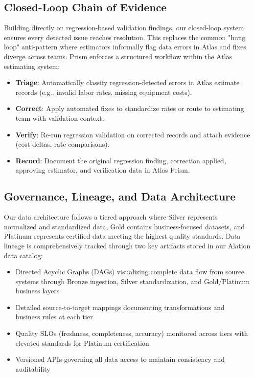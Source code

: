 \documentclass[12pt, a4paper]{article}
\begin{document}
\subsection{Closed-Loop Chain of Evidence}
Building directly on regression-based validation findings, our closed-loop system ensures every detected issue reaches resolution. This replaces the common "hung loop" anti-pattern where estimators informally flag data errors in Atlas and fixes diverge across teams. Prism enforces a structured workflow within the Atlas estimating system:
\begin{itemize}[leftmargin=*, nosep]
    \item \textbf{Triage}: Automatically classify regression-detected errors in Atlas estimate records (e.g., invalid labor rates, missing equipment costs).
    \item \textbf{Correct}: Apply automated fixes to standardize rates or route to estimating team with validation context.
    \item \textbf{Verify}: Re-run regression validation on corrected records and attach evidence (cost deltas, rate comparisons).
    \item \textbf{Record}: Document the original regression finding, correction applied, approving estimator, and verification data in Atlas Prism.
\end{itemize}

\subsection{Governance, Lineage, and Data Architecture}
Our data architecture follows a tiered approach where Silver represents normalized and standardized data, Gold contains business-focused datasets, and Platinum represents certified data meeting the highest quality standards. Data lineage is comprehensively tracked through two key artifacts stored in our Alation data catalog:

\begin{itemize}[leftmargin=*, nosep]
    \item Directed Acyclic Graphs (DAGs) visualizing complete data flow from source systems through Bronze ingestion, Silver standardization, and Gold/Platinum business layers
    \item Detailed source-to-target mappings documenting transformations and business rules at each tier
    \item Quality SLOs (freshness, completeness, accuracy) monitored across tiers with elevated standards for Platinum certification
    \item Versioned APIs governing all data access to maintain consistency and auditability
\end{itemize}
\end{document}
